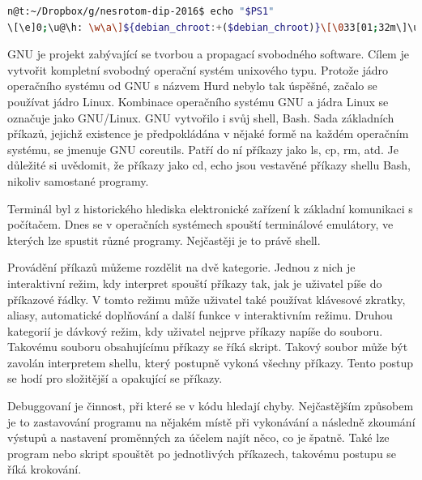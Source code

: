 \documentclass[thesis=M,czech]{FITthesis}[2012/06/26]
\begin{document}
\begin{minipage}{\linewidth}
\begin{lstlisting}[language=bash, caption={Prompt v shellu}, label={lst:prompt}]
n@t:~/Dropbox/g/nesrotom-dip-2016$ echo "$PS1"
\[\e]0;\u@\h: \w\a\]${debian_chroot:+($debian_chroot)}\[\033[01;32m\]\u@\h\[\033[00m\]:\[\033[01;34m\]\w\[\033[00m\]\$ 
\end{lstlisting}
\end{minipage}



GNU je projekt zabývající se tvorbou a propagací svobodného software. Cílem je vytvořit kompletní svobodný operační systém unixového typu. Protože jádro operačního systému od GNU s názvem Hurd nebylo tak úspěšné, začalo se používat jádro Linux. Kombinace operačního systému GNU a jádra Linux se označuje jako GNU/Linux. GNU vytvořilo i svůj shell, Bash. Sada základních příkazů, jejichž existence je předpokládána v nějaké formě na každém operačním systému, se jmenuje GNU coreutils. Patří do ní příkazy jako ls, cp, rm, atd. Je důležité si uvědomit, že příkazy jako cd, echo jsou vestavěné příkazy shellu Bash, nikoliv samostané programy.


Terminál byl z historického hlediska elektronické zařízení k základní komunikaci s počítačem. Dnes se v operačních systémech spouští terminálové emulátory, ve kterých lze spustit různé programy. Nejčastěji je to právě shell.


Provádění příkazů můžeme rozdělit na dvě kategorie. Jednou z nich je interaktivní režim, kdy interpret spouští příkazy tak, jak je uživatel píše do příkazové řádky. V tomto režimu může uživatel také používat klávesové zkratky, aliasy, automatické doplňování a další funkce v interaktivním režimu. Druhou kategorií je dávkový režim, kdy uživatel nejprve příkazy napíše do souboru. Takovému souboru obsahujícímu příkazy se říká skript. Takový soubor může být zavolán interpretem shellu, který postupně vykoná všechny příkazy. Tento postup se hodí pro složitější a opakující se příkazy.


Debuggovaní je činnost, při které se v kódu hledají chyby. Nejčastějším způsobem je to zastavování programu na nějakém místě při vykonávání a následně zkoumání výstupů a nastavení proměnných za účelem najít něco, co je špatně. Také lze program nebo skript spouštět po jednotlivých příkazech, takovému postupu se říká krokování.
\end{document}
